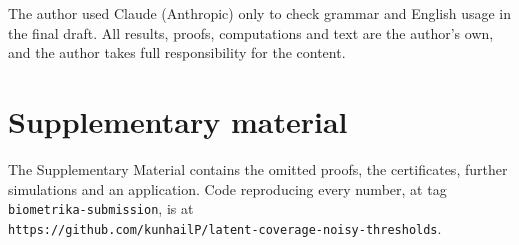 \documentclass[lineno]{biometrika}
\begin{document}
The author used Claude (Anthropic) only to check grammar and English usage in the final draft. All results, proofs, computations and text are the author's own, and the author takes full responsibility for the content.

\section*{Supplementary material}\label{SM}

The Supplementary Material contains the omitted proofs, the certificates, further simulations and an application. Code reproducing every number, at tag \texttt{biometrika-submission}, is at\\ \texttt{https://github.com/kunhailP/latent-coverage-noisy-thresholds}.



\end{document}
